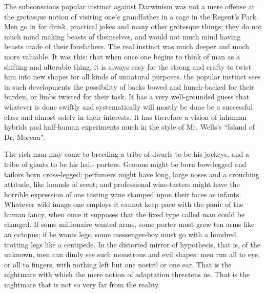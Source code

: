 \documentclass[final,10pt,letterpaper,twocolumn,openany]{book}
\begin{document}
The subconscious popular instinct against Darwinism was not a mere
offense at the grotesque notion of visiting one's grandfather in a cage in
the Regent's Park. Men go in for drink, practical jokes and many other
grotesque things; they do not much mind making beasts of themselves,
and would not much mind having beasts made of their forefathers. The
real instinct was much deeper and much more valuable. It was this: that
when once one begins to think of man as a shifting and alterable thing, it is
always easy for the strong and crafty to twist him into new shapes for all
kinds of unnatural purposes. the popular instinct sees in such
developments the possibility of backs bowed and hunch-backed for their
burden, or limbs twisted for their task. It has a very well-grounded guess
that whatever is done swiftly and systematically will mostly be done be a
successful class and almost solely in their interests. It has therefore a
vision of inhuman hybrids and half-human experiments much in the style
of Mr. Wells's ``Island of Dr. Moreau". 

The rich man may come to breeding
a tribe of dwarfs to be his jockeys, and a tribe of giants to be his hall-
porters. Grooms might be born bow-legged and tailors born cross-legged;
perfumers might have long, large noses and a crouching attitude, like
hounds of scent; and professional wine-tasters might have the horrible
expression of one tasting wine stamped upon their faces as infants.
Whatever wild image one employs it cannot keep pace with the panic of
the human fancy, when once it supposes that the fixed type called man
could be changed. If some millionaire wanted arms, some porter must
grow ten arms like an octopus; if he wants legs, some messenger-boy must
go with a hundred trotting legs like a centipede. In the distorted mirror of
hypothesis, that is, of the unknown, men can dimly see such monstrous
and evil shapes; men run all to eye, or all to fingers, with nothing left but
one nostril or one ear. That is the nightmare with which the mere notion of
adaptation threatens us. That is the nightmare that is not so very far from
the reality.
\end{document}
